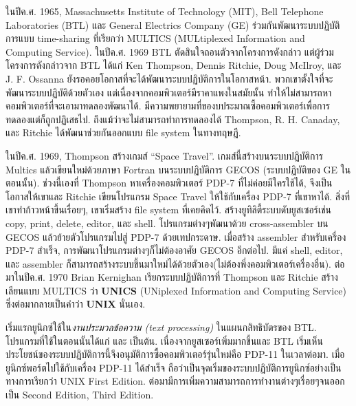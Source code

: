 \begin{thwbr}
{{ในปีค.ศ. 1965, Massachusetts Institute of Technology (MIT), Bell Telephone Laboratories (BTL)
และ General Electrics Company (GE) ร่วมกันพัฒนาระบบปฏิบัติการแบบ time-sharing ที่เรียกว่า MULTICS (MULtiplexed Information and Computing Service). ในปีค.ศ. 1969 BTL ตัดสินใจถอนตัวจากโครงการดังกล่าว แต่ผู้ร่วมโครงการดังกล่าวจาก BTL ได้แก่ Ken Thompson, Dennis Ritchie, Doug McIlroy, และ J. F. Ossanna ยังรอคอยโอกาสที่จะได้พัฒนาระบบปฏิบัติการในโอกาสหน้า. พวกเขาตั้งใจที่จะพัฒนาระบบปฏิบัติด้วยตัวเอง แต่เนื่องจากคอมพิวเตอร์มีราคาแพงในสมัยนั้น ทำให้ไม่สามารถหาคอมพิวเตอร์ที่จะเอามาทดลองพัฒนาได้. มีความพยายามที่ของบประมาณซื้อคอมพิวเตอร์เพื่อการทดลองแต่ก็ถูกปฏิเสธไป. ถึงแม้ว่าจะไม่สามารถทำการทดลองได้ Thompson, R. H. Canaday, และ Ritchie ได้พัฒนาช่วยกันออกแบบ file system ในทางทฤษฎี. 

ในปีค.ศ. 1969, Thompson สร้างเกมส์ ``Space Travel''. เกมส์นี้สร้างบนระบบปฏิบัติการ Multics แล้วเขียนใหม่ด้วยภาษา Fortran บนระบบปฏิบัติการ  GECOS (ระบบปฏิบัติของ GE ในตอนนั้น). ช่วงนี้เองที่ Thompson หาเครื่องคอมพิวเตอร์ PDP-7 ที่ไม่ค่อยมีใครใช้ได้, จึงเป็นโอกาสให้เขาและ Ritchie เขียนโปรแกรม Space Travel ให้ใช้กับเครื่อง PDP-7 ที่เขาหาได้. สิ่งที่เขาทำก้าวหน้าขึ้นเรื่อยๆ, เขาเริ่มสร้าง file system ที่เคยคิดไว้. สร้างยูทิลิตี้ระบบดับยูสเซอร์เช่น copy, print, delete, editor, และ shell. โปรแกรมต่างๆพัฒนาด้วย cross-assembler บน GECOS แล้วย้ายตัวโปรแกรมไปสู่ PDP-7 ด้วยเทปกระดาษ. เมื่อสร้าง assembler สำหรับเครื่อง PDP-7 สำเร็จ, การพัฒนาโปรแกรมต่างๆก็ไม่ต้องอาศัย GECOS อีกต่อไป. มีแค่ shell, editor, และ assembler ก็สามารถสร้างระบบขึ้นมาใหม่ได้ด้วยตัวเอง(ไม่ต้องพึ่งคอมพิวเตอร์เครื่องอื่น).
ต่อมาในปีค.ศ. 1970 Brian Kernighan เรียกระบบปฏิบัติการที่ Thompson และ Ritchie สร้างเลียนแบบ MULTICS ว่า {\bf UNICS} (UNiplexed Information and Computing Service) ซึ่งต่อมากลายเป็นคำว่า {\bf UNIX} นั่นเอง. 

เริ่มแรกยูนิกซ์ใช้ใน{\em งานประมวลข้อความ (text processing)} ในแผนกสิทธิบัตรของ BTL. โปรแกรมที่ใช้ในตอนนั้นได้แก่  และ  เป็นต้น. เนื่องจากยูสเซอร์เพิ่มมากขึ้นและ BTL เริ่มเห็นประโยชน์ของระบบปฏิบัติการนี้จึงอนุมัติการซื้อคอมพิวเตอร์รุ่นใหม่คือ PDP-11 ในเวลาต่อมา. เมื่อยูนิกซ์พอร์ตไปใช้กับเครื่อง PDP-11 ได้สำเร็จ ถือว่าเป็นจุดเริ่มของระบบปฏิบัติการยูนิกซ์อย่างเป็นทางการเรียกว่า UNIX First Edition. ต่อมามีการเพิ่มความสามารถการทำงานต่างๆเรื่อยๆจนออกเป็น Second Edition, Third Edition.

}}
\end{thwbr}

